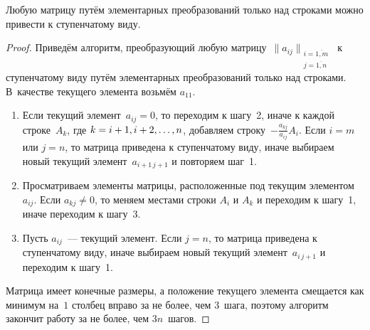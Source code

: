 \begin{theorem}
Любую матрицу путём элементарных преобразований только над строками можно привести к ступенчатому виду.
\end{theorem}
\begin{proof}
Приведём алгоритм, преобразующий любую матрицу~$\|a_{ij}\|_{\begin{smallmatrix}
i = \overline{1,m} \\
j = \overline{1,n}
\end{smallmatrix}}$ к ступенчатому виду путём элементарных преобразований только над строками.
В~качестве текущего элемента возьмём $a_{11}$.
\begin{enumerate}
	\item Если текущий элемент~$a_{ij} = 0$, то переходим к шагу~2, иначе к каждой строке~$A_k$, где $k \opbr= i + 1, i + 2, \ldots, n$, добавляем строку~$-\frac{a_{kj}}{a_{ij}} A_i$.
	Если $i = m$ или $j = n$, то матрица приведена к ступенчатому виду, иначе выбираем новый текущий элемент~$a_{i+1\, j+1}$ и повторяем шаг~1.
	\item Просматриваем элементы матрицы, расположенные под текущим элементом~$a_{ij}$.
	Если $a_{kj} \neq 0$, то меняем местами строки $A_i$ и $A_k$ и переходим к шагу~1, иначе переходим к шагу~3.
	\item Пусть $a_{ij}$~--- текущий элемент.
	Если $j = n$, то матрица приведена к ступенчатому виду, иначе выбираем новый текущий элемент~$a_{i\, j + 1}$ и переходим к шагу~1.
\end{enumerate}

Матрица имеет конечные размеры, а положение текущего элемента смещается как минимум на~$1$ столбец вправо за не более, чем $3$~шага, поэтому алгоритм закончит работу за не более, чем $3n$~шагов.
\end{proof}